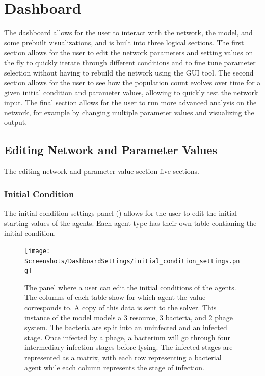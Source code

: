 \section{Dashboard}
The dashboard allows for the user to interact with the network, the model, and some prebuilt visualizations, and is built into three logical sections. 
The first section allows for the user to edit the network parameters and setting values on the fly to quickly iterate through different conditions and to fine tune parameter selection without having to rebuild the network using the GUI tool. 
The second section allows for the user to see how the population count evolves over time for a given initial condition and parameter values, allowing to quickly test the network input. 
The final section allows for the user to run more advanced analysis on the network, for example by changing multiple parameter values and visualizing the output. 


\subsection{Editing Network and Parameter Values}
\label{sec:editing_network_and_parameter_values}
The editing network and parameter value section five sections. 
\subsubsection{Initial Condition}
The initial condition settings panel () allows for the user to edit the initial starting values of the agents. Each agent type has their own table contianing the initial condition. 
\begin{figure}
    \centering
    \texttt{[image: Screenshots/DashboardSettings/initial\_condition\_settings.png]}
    \caption{
        The panel where a user can edit the initial conditions of the agents. 
        The columns of each table show for which agent the value corresponds to. 
        A copy of this data is sent to the solver. 
        This instance of the model models a 3 resource, 3 bacteria, and 2 phage system. 
        The bacteria are split into an uninfected and an infected stage. 
        Once infected by a phage, a bacterium will go through four intermediary infection stages before lysing. 
        The infected stages are represented as a matrix, with each row representing a bacterial agent while each column represents the stage of infection. 
    }
    \label{fig:ss:ds:initial_condition}
\end{figure}

